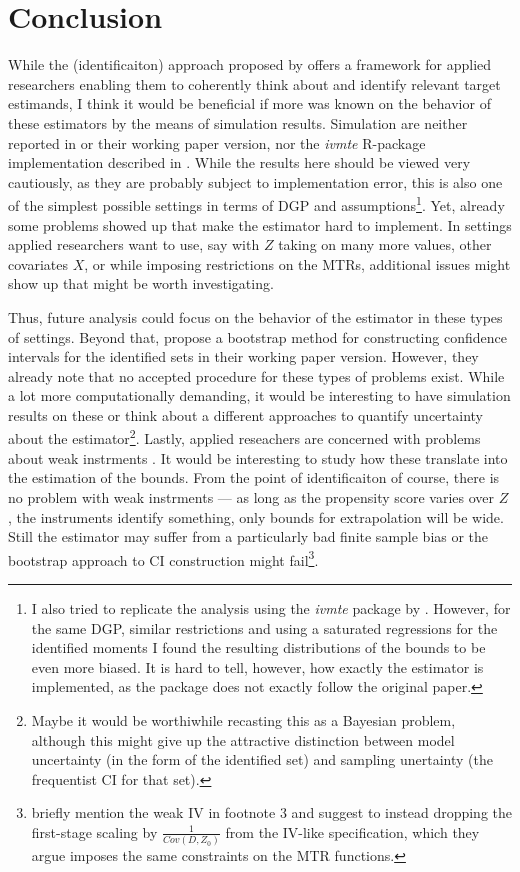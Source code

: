 \documentclass[11pt, a4paper, leqno]{article}
\begin{document}
\section{Conclusion}
While the (identificaiton) approach proposed by \citet{mogstad2018using} offers a framework for applied researchers enabling them to coherently think about and identify relevant target estimands, I think it would be beneficial if more was known on the behavior of these estimators by the means of simulation results.
Simulation are neither reported in \citet{mogstad2018using} or their working paper version, nor the \textit{ivmte} R-package implementation described in \citet{shea2021ivmte}.
While the results here should be viewed very cautiously, as they are probably subject to implementation error, this is also one of the simplest possible settings in terms of DGP and assumptions\footnote{I also tried to replicate the analysis using the \textit{ivmte} package by \citet{shea2021ivmte}. However, for the same DGP, similar restrictions and using a saturated regressions for the identified moments I found the resulting distributions of the bounds to be even more biased. It is hard to tell, however, how exactly the estimator is implemented, as the package does not exactly follow the original \citet{mogstad2018using} paper.}. Yet, already some problems showed up that make the estimator hard to implement.
In settings applied researchers want to use, say with $Z$ taking on many more values, other covariates $X$, or while imposing restrictions on the MTRs, additional issues might show up that might be worth investigating.

Thus, future analysis could focus on the behavior of the estimator in these types of settings.
Beyond that, \citet{mogstad2018using} propose a bootstrap method for constructing confidence intervals for the identified sets in their working paper version.
However, they already note that no accepted procedure for these types of problems exist. While a lot more computationally demanding, it would be interesting to have simulation results on these or think about a different approaches to quantify uncertainty about the estimator\footnote{Maybe it would be worthiwhile recasting this as a Bayesian problem, although this might give up the attractive distinction between model uncertainty (in the form of the identified set) and sampling unertainty (the frequentist CI for that set).}.
Lastly, applied reseachers are concerned with problems about weak instrments \citep{andrews2019weak}. It would be interesting to study how these translate into the estimation of the bounds.
From the point of identificaiton of course, there is no problem with weak instrments --- as long as the propensity score varies over $Z$, the instruments identify something, only bounds for extrapolation will be wide. Still the estimator may suffer from a particularly bad finite sample bias or the bootstrap approach to CI construction might fail\footnote{\citet{mogstad2018using} briefly mention the weak IV in footnote 3 and suggest to instead dropping the first-stage scaling by $\frac{1}{Cov(D,Z_0)}$ from the IV-like specification, which they argue imposes the same constraints on the MTR functions.}.
\end{document}
